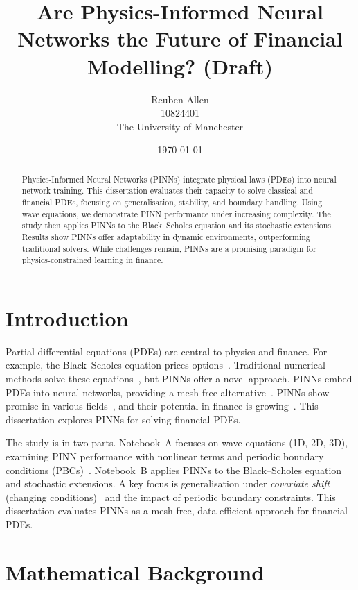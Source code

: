 \documentclass[12pt,a4paper]{article}
\title{Are Physics-Informed Neural Networks the Future of Financial Modelling? (Draft)}
\author{Reuben Allen \\ 10824401 \\ The University of Manchester}
\date{\today}
\begin{document}
\maketitle

\begin{abstract}
Physics-Informed Neural Networks (PINNs) integrate physical laws (PDEs) into neural network training. This dissertation evaluates their capacity to solve classical and financial PDEs, focusing on generalisation, stability, and boundary handling. Using wave equations, we demonstrate PINN performance under increasing complexity. The study then applies PINNs to the Black–Scholes equation and its stochastic extensions. Results show PINNs offer adaptability in dynamic environments, outperforming traditional solvers. While challenges remain, PINNs are a promising paradigm for physics-constrained learning in finance.
\end{abstract}

\section{Introduction}

Partial differential equations (PDEs) are central to physics and finance. For example, the Black–Scholes equation prices options~\cite{black1973pricing}. Traditional numerical methods solve these equations~\cite{leveque2007finite, morton2005numerical}, but PINNs offer a novel approach. PINNs embed PDEs into neural networks, providing a mesh-free alternative~\cite{raissi2019physics, karniadakis2021physics}. PINNs show promise in various fields~\cite{cuomo2022scientific}, and their potential in finance is growing~\cite{sirignano2018deep}. This dissertation explores PINNs for solving financial PDEs.

The study is in two parts. Notebook~A focuses on wave equations (1D, 2D, 3D), examining PINN performance with nonlinear terms and periodic boundary conditions (PBCs)~\cite{wang2022understanding, zang2020adaptive}. Notebook~B applies PINNs to the Black–Scholes equation and stochastic extensions. A key focus is generalisation under \textit{covariate shift} (changing conditions)~\cite{quinonero2009dataset} and the impact of periodic boundary constraints. This dissertation evaluates PINNs as a mesh-free, data-efficient approach for financial PDEs.

\section{Mathematical Background}
\end{document}
